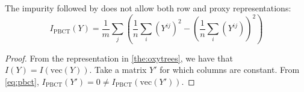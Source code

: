 \begin{appendices}
\begin{corollary}
The impurity followed by \citet{pliakos_global_2018} does not allow both row and proxy representations:
\begin{equation}
    \label{eq:pbct}
    I_\text{PBCT}(Y) = \frac{1}{m}\sum_j\left(\frac{1}{n}\sum_i (Y^{ij})^2 - \left(\frac{1}{n}\sum_i (Y^{ij})\right)^2\right)
\end{equation}
\end{corollary}
\begin{proof}
   From the representation in \cref{the:oxytrees}, we have that $I(Y) = I(\text{vec}(Y))$.
   Take a matrix $Y'$ for which columns are constant. From \cref{eq:pbct}, $I_\text{PBCT}(Y')=0 \neq I_\text{PBCT}(\text{vec}(Y'))$.
\end{proof}

%
%
%
%
%
%
%
%

\end{appendices}
